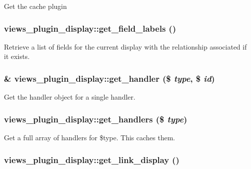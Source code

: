 Get the cache plugin \hypertarget{classviews__plugin__display_a519531ff1725cb9211c04cc9cfc3679}{
\subsubsection[{get\_\-field\_\-labels}]{\setlength{\rightskip}{0pt plus 5cm}views\_\-plugin\_\-display::get\_\-field\_\-labels ()}}
\label{classviews__plugin__display_a519531ff1725cb9211c04cc9cfc3679}


Retrieve a list of fields for the current display with the relationship associated if it exists. \hypertarget{classviews__plugin__display_f76b2461cd87d7965a442bae077aa772}{
\subsubsection[{get\_\-handler}]{\setlength{\rightskip}{0pt plus 5cm}\& views\_\-plugin\_\-display::get\_\-handler (\$ {\em type}, \/  \$ {\em id})}}
\label{classviews__plugin__display_f76b2461cd87d7965a442bae077aa772}


Get the handler object for a single handler. \hypertarget{classviews__plugin__display_8ca4ff604c846359bfce009a75a264be}{
\subsubsection[{get\_\-handlers}]{\setlength{\rightskip}{0pt plus 5cm}views\_\-plugin\_\-display::get\_\-handlers (\$ {\em type})}}
\label{classviews__plugin__display_8ca4ff604c846359bfce009a75a264be}


Get a full array of handlers for \$type. This caches them. \hypertarget{classviews__plugin__display_97a467c1f9faecd9f1ca60f83e1193d2}{
\subsubsection[{get\_\-link\_\-display}]{\setlength{\rightskip}{0pt plus 5cm}views\_\-plugin\_\-display::get\_\-link\_\-display ()}}
\label{classviews__plugin__display_97a467c1f9faecd9f1ca60f83e1193d2}


